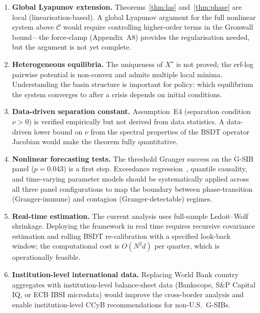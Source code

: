 \documentclass[11pt]{article}
\theoremstyle{definition}
\newcommand{\Xst}{X^{\star}}
\newcommand{\Cman}{\mathcal{C}}
\begin{document}
\begin{enumerate}
  \item \textbf{Global Lyapunov extension.}  Theorems~\ref{thm:las} and~\ref{thm:phase}
        are local (linearisation-based).  A global Lyapunov argument for the full
        nonlinear system above $\Cman$ would require controlling higher-order terms
        in the Gronwall bound---the force-clamp (Appendix~A8) provides the
        regularisation needed, but the argument is not yet complete.

  \item \textbf{Heterogeneous equilibria.}  The uniqueness of $\Xst$ is not proved;
        the erf-log pairwise potential is non-convex and admits multiple local minima.
        Understanding the basin structure is important for policy: which equilibrium
        the system converges to after a crisis depends on initial conditions.

  \item \textbf{Data-driven separation constant.}  Assumption~E4 (separation condition
        $\nu > 0$) is verified empirically but not derived from data statistics.
        A data-driven lower bound on $\nu$ from the spectral properties of the
        BSDT operator Jacobian would make the theorem fully quantitative.

  \item \textbf{Nonlinear forecasting tests.}  The threshold Granger success
        on the G-SIB panel ($p = 0.043$) is a first step.  Exceedance
        regression~\citep{allen2012systemic}, quantile causality, and
        time-varying parameter models should be systematically applied across
        all three panel configurations to map the boundary between
        phase-transition (Granger-immune) and contagion (Granger-detectable)
        regimes.

  \item \textbf{Real-time estimation.}  The current analysis uses full-sample
        Ledoit--Wolf shrinkage.  Deploying the framework in real time requires
        recursive covariance estimation and rolling BSDT re-calibration with
        a specified look-back window; the computational cost is $O(N^2 d)$ per
        quarter, which is operationally feasible.

  \item \textbf{Institution-level international data.}  Replacing World Bank
        country aggregates with institution-level balance-sheet data
        (Bankscope, S\&P Capital IQ, or ECB IBSI microdata) would improve the
        cross-border analysis and enable institution-level CCyB recommendations
        for non-U.S.\ G-SIBs.
\end{enumerate}
\end{document}
